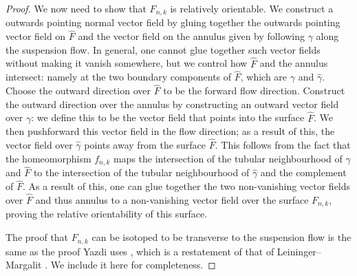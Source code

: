 \begin{proof}

We now need to show that $F_{n,k}$ is relatively orientable. We construct a outwards pointing normal vector field by gluing together the outwards pointing vector field on $\widehat{F}$ and the vector field on the annulus given by following $\gamma$ along the suspension flow.
In general, one cannot glue together such vector fields without making it vanish somewhere, but we control how $\widehat{F}$ and the annulus intersect: namely at the two boundary components of $\widehat{F}$, which are $\gamma$ and $\widehat{\gamma}$.
Choose the outward direction over $\widehat{F}$ to be the forward flow direction.
Construct the outward direction over the annulus by constructing an outward vector field over $\gamma$: we define this to be the vector field that points into the surface $\widehat{F}$.
We then pushforward this vector field in the flow direction; as a result of this, the vector field over $\widehat{\gamma}$ points away from the surface $\widehat{F}$.
This follows from the fact that the homeomorphism $f_{n,k}$ maps the intersection of the tubular neighbourhood of $\gamma$ and $\widehat{F}$ to the intersection of the tubular neighbourhood of $\widehat{\gamma}$ and the complement of $\widehat{F}$.
As a result of this, one can glue together the two non-vanishing vector fields over $\widehat{F}$ and thus annulus to a non-vanishing vector field over the surface $F_{n,k}$, proving the relative orientability of this surface.


  The proof that $F_{n,k}$ can be isotoped to be transverse to the suspension flow is the same as the
  proof Yazdi uses \cite{yazdi2018pseudo}, which is a restatement of that of Leininger--Margalit \cite{leininger2013number}. We include it here for completeness.  
  

\end{proof}
